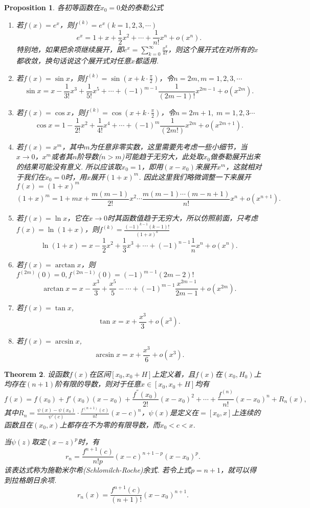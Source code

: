 \documentclass{article}
\newtheorem{theorem}{Theorem}[section]
\newtheorem{proposition}[theorem]{Proposition}
\begin{document}
\begin{proposition}
\rm {\color{red}各初等函数在$x_0 = 0$处的泰勒公式}
\begin{enumerate}
	\item {\color{red}若$f(x) = e^x$}，则$f^{(k)} = e^x(k=1,2,3,\cdots)$
	$$
	e^x = 1 + x + \frac{1}{2}x^2 + \cdots + \frac{1}{n!}x^n + o(x^n). 
	$$
	特别地，如果把余项继续展开，即$e^x =\sum\limits_{k=0}^{\infty}\frac{x^k}{k!}$，则这个展开式在对所有的$x$都收敛，换句话说这个展开式对任意$x$都适用.
	\item {\color{red}若$f(x) = \sin x$}，则$f^{(k)} = \sin (x+ k\cdot \frac{\pi}{2})$，令$n=2m, m = 1,2,3,\cdots$
	$$
	\sin x = x - \frac{1}{3!}x^3 + \frac{1}{5!}x^5 + \cdots + (-1)^{m-1}\frac{1}{(2m-1)!}x^{2m-1}+o(x^{2m}).
	$$
	\item {\color{red}若$f(x) = \cos x$}，则$f^{(k)} = \cos (x+k\cdot \frac{\pi}{2})$，令$n=2m+1,\; m = 1,2,3\cdots$
	$$
	\cos x = 1 - \frac{1}{2!}x^2 + \frac{1}{4!}x^4 + \cdots + (-1)^{m} \frac{1}{(2m!)}x^{2m} + o(x^{2m+1}).
	$$
	\item {\color{red}若$f(x)=x^m$}，其中$m$为任意非零实数，这里需要先考虑一些小细节，当$x \rightarrow 0$，$x^m$或者其$n$阶导数($n > m$)可能趋于无穷大，此处取$x_0$做泰勒展开出来的结果可能没有意义. 所以应该取$x_0 = 1$，即用$(x-x_0)$来展开$x^m$，这就相对于我们在$x_0 = 0$时，用$x$展开$(1+x)^m$. 因此这里我们略微调整一下来展开$f(x) = (1+x)^m$
	$$
	(1+x)^m = 1 + mx + \frac{m(m-1)}{2!}x^2 \cdots \frac{m(m-1)\cdots(m-n+1)}{n!}x^n + o(x^{n+1}).
	$$
	\item {\color{red}若$f(x) = \ln x$}，它在$x \rightarrow 0$时其函数值趋于无穷大，所以仿照前面，只考虑$f(x) = \ln (1+x)$，则$f^{(k)} = \frac{(-1)^{k-1}(k-1)!}{(1+x)^k}$
	$$
	\ln (1+x) = x - \frac{1}{2} x^2 + \frac{1}{3}x^3 +\cdots + (-1)^{n-1}\frac{1}{n}x^n + o(x^{n}).
	$$
	\item {\color{red}若$f(x) = \arctan x$}，则$f^{(2m)}(0) = 0,f^{(2m-1)}(0) = (-1)^{m-1}(2m-2)!$
	$$
	\arctan x = x-\frac{x^3}{3} + \frac{x^5}{5} - \cdots + (-1)^{m-1}\frac{x^{2m-1}}{2m-1} + o(x^{2m}).
	$$
	\item 若{\color{red}$f(x) = \tan x$},
	$$
	\tan x =x + \frac{x^3}{3} + o(x^3).
	$$
	\item 若{\color{red}$f(x) = \arcsin x$},
	$$
	\arcsin x = x + \frac{x^3}{6} + o(x^3).
	$$
\end{enumerate}
\end{proposition}


\begin{theorem}
\rm 设函数$f(x)$在区间$[x_0, x_0 + H]$上定义着，且$f(x)$在$(x_0,H_0)$上均存在$(n+1)$阶有限的导数，则对于任意$x \in [x_0,x_0+H]$均有
$$
f(x) = f(x_0) + f'(x_0)(x-x_0) + \frac{f^{''}(x_0)}{2!}(x-x_0)^2 + \cdots + \frac{f^{(n)}}{n!}(x-x_0)^n + R_n(x),
$$
其中$R_n = \frac{\psi(x) -\psi(x_0)}{\psi'(c)}\cdot \frac{f^{(n+1)}(c)}{n!}(x-c)^n$，$\psi(x)$是定义在$=[x_0,x]$上连续的函数且在$(x_0,x)$上都存在不为零的有限导数，而$x_0 < c < x$. 

当$\psi(z)$取定$(x-z)^p$时，有
$$
r_n = \frac{f^{n+1}(c)}{n!p}(x-c)^{n+1-p}(x-x_0)^p.
$$
该表达式称为{\color{red}施勒米尔希(Schlomilch-Roche)余式}. 若令上式$p=n+1$，就可以得到{\color{red}拉格朗日余项}.
$$
r_n(x) = \frac{f^{n+1}(c)}{(n+1)!}(x-x_0)^{n+1}.
$$
\end{theorem}
\end{document}
